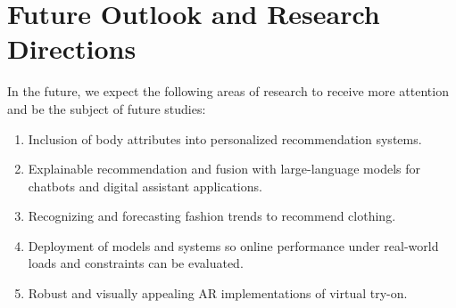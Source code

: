\section{Future Outlook and Research Directions} \label{section:future}
	In the future, we expect the following areas of research to receive more attention and be the subject of future studies:

	\begin{enumerate}
		\item Inclusion of body attributes into personalized recommendation systems.
		\item Explainable recommendation and fusion with large-language models for chatbots and digital assistant applications.
		\item Recognizing and forecasting fashion trends to recommend clothing.
		\item Deployment of models and systems so online performance under real-world loads and constraints can be evaluated.
		\item Robust and visually appealing AR implementations of virtual try-on.
	\end{enumerate}